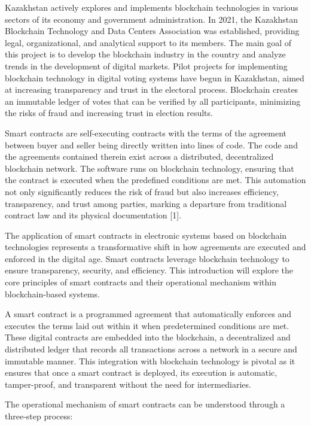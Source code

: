 Kazakhstan actively explores and implements blockchain technologies in
various sectors of its economy and government administration. In 2021,
the Kazakhstan Blockchain Technology and Data Centers Association was
established, providing legal, organizational, and analytical support to
its members. The main goal of this project is to develop the blockchain
industry in the country and analyze trends in the development of digital
markets. Pilot projects for implementing blockchain technology in
digital voting systems have begun in Kazakhstan, aimed at increasing
transparency and trust in the electoral process. Blockchain creates an
immutable ledger of votes that can be verified by all participants,
minimizing the risks of fraud and increasing trust in election results.

Smart contracts are self-executing contracts with the terms of the
agreement between buyer and seller being directly written into lines of
code. The code and the agreements contained therein exist across a
distributed, decentralized blockchain network. The software runs on
blockchain technology, ensuring that the contract is executed when the
predefined conditions are met. This automation not only significantly
reduces the risk of fraud but also increases efficiency, transparency,
and trust among parties, marking a departure from traditional contract
law and its physical documentation {[}1{]}.

The application of smart contracts in electronic systems based on
blockchain technologies represents a transformative shift in how
agreements are executed and enforced in the digital age. Smart contracts
leverage blockchain technology to ensure transparency, security, and
efficiency. This introduction will explore the core principles of smart
contracts and their operational mechanism within blockchain-based
systems.

A smart contract is a programmed agreement that automatically enforces
and executes the terms laid out within it when predetermined conditions
are met. These digital contracts are embedded into the blockchain, a
decentralized and distributed ledger that records all transactions
across a network in a secure and immutable manner. This integration with
blockchain technology is pivotal as it ensures that once a smart
contract is deployed, its execution is automatic, tamper-proof, and
transparent without the need for intermediaries.

The operational mechanism of smart contracts can be understood through a
three-step process:

